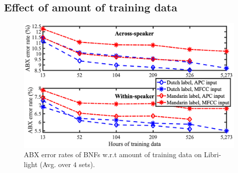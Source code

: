 \documentclass[a4paper]{article}
\begin{document}









\subsection{Effect of amount of training data}
\begin{figure}[!t]
    \centering
    \includegraphics[width=\linewidth]{LaTeX/crsling_dnn_bnf_apc_input_vert_no_prefix_adt_apc_across_9.36_hori_no_hrs.png}
    \caption{ABX error rates of BNFs w.r.t amount of training data on Libri-light (Avg. over $4$ sets).}
    \label{fig:dnn_bnf_data_amount}
\end{figure}
\end{document}
